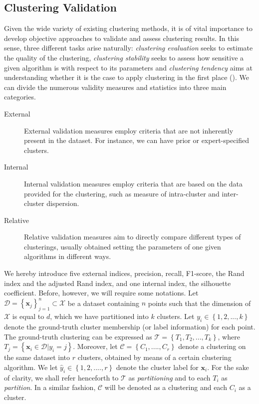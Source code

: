 \documentclass[a4paper]{article}
\begin{document}
	\subsection{Clustering Validation}
	Given the wide variety of existing clustering methods, it is of vital importance to develop objective approaches to validate and assess clustering results. In this sense, three different tasks arise naturally: \textit{clustering evaluation} seeks to estimate the quality of the clustering, \textit{clustering stability} seeks to assess how sensitive a given algorithm is with respect to its parameters and \textit{clustering tendency} aims at understanding whether it is the case to apply clustering in the first place (\cite{zaki2014dataminingbook}).
	We can divide the numerous validity measures and statistics into three main categories.
	\begin{description}
		\item[External] External validation measures employ criteria that are not inherently present in the dataset. For instance, we can have prior or expert-specified clusters.
		\item[Internal] Internal validation measures employ criteria that are based on the data provided for the clustering, such as measure of intra-cluster and inter-cluster dispersion.
		\item[Relative] Relative validation measures aim to directly compare different types of clusterings, usually obtained setting the parameters of one given algorithms in different ways.
	\end{description}
	We hereby introduce five external indices, precision, recall, F1-score, the Rand index and the adjusted Rand index, and one internal index, the silhouette coefficient.
	Before, however, we will require some notations.
	Let $\mathcal{D} = \left\{ \boldsymbol{x}_{j} \right\}_{j=1}^{n} \subset \mathcal{X}$ be a dataset containing $n$ points such that the dimension of $\mathcal{X}$ is equal to $d$, which we have partitioned into $k$ clusters. Let $y_{i} \in \left\{ 1, 2, ..., k \right\} $ denote the ground-truth cluster membership (or label information) for each point. The ground-truth clustering can be expressed as $\mathcal{T} = \left\{ T_{1}, T_{2}, ..., T_{k} \right\}$, where $T_{j} = \left\{ \boldsymbol{x}_{i} \in \mathcal{D} | y_{i} = j \right\}$. Moreover, let $\mathcal{C} = \left\{ C_{1}, ...., C_{r} \right\} $ denote a clustering on the same dataset into $r$ clusters, obtained by means of a certain clustering algorithm. We let $\hat{y}_{i} \in \left\{ 1, 2, ...., r \right\}$ denote the cluster label for $\boldsymbol{x}_{i}$. For the sake of clarity, we shall refer henceforth to $\mathcal{T}$ as \textit{partitioning} and to each $T_{i}$ as \textit{partition}. In a similar fashion, $\mathcal{C}$ will be denoted as a clustering and each $C_{i}$ as a cluster.
\end{document}
